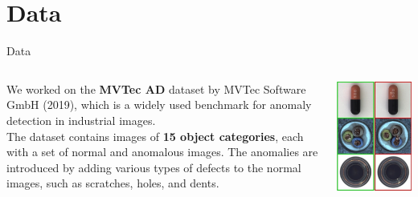 \documentclass{beamer}
\begin{document}
\section{Data}
\begin{frame}{Data}
\begin{columns}
\begin{column}{0.7\textwidth}
      We worked on the \textbf{MVTec AD} \cite{mvtecad} dataset by MVTec Software GmbH (2019), which is a
       widely used benchmark for anomaly detection in industrial images.\\

        The dataset contains images of \textbf{15 object categories}, each with a
         set of normal and anomalous images.
          The anomalies are introduced by adding various types of defects to the
           normal images, such as scratches, holes, and dents.
\end{column}
           \begin{column}{0.3\textwidth}
            \includegraphics[width=\textwidth]
            {assets/mvtec}
            \end{column}
            \end{columns}
                  
\end{frame}
\end{document}
